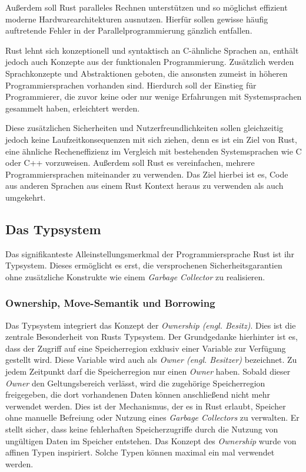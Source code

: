 Außerdem soll Rust paralleles Rechnen unterstützen und
so möglichst effizient moderne Hardwarearchitekturen ausnutzen.
Hierfür sollen gewisse häufig auftretende Fehler in der Parallelprogrammierung gänzlich entfallen.
\cite{theRustLanguage}

Rust lehnt sich konzeptionell und syntaktisch an C-ähnliche Sprachen an, enthält jedoch auch Konzepte aus der
funktionalen Programmierung. Zusätzlich werden Sprachkonzepte und Abstraktionen geboten, die
ansonsten zumeist in höheren Programmiersprachen vorhanden sind. Hierdurch soll der Einstieg für
Programmierer, die zuvor keine oder nur wenige Erfahrungen mit Systemsprachen gesammelt haben, erleichtert werden.
\cite{engineeringServo}

Diese zusätzlichen Sicherheiten und Nutzerfreundlichkeiten sollen gleichzeitig jedoch keine Laufzeitkonsequenzen mit 
sich ziehen, denn es ist ein Ziel von Rust, 
eine ähnliche Recheneffizienz im Vergleich mit bestehenden Systemsprachen wie C oder C++ vorzuweisen.
Außerdem soll Rust es vereinfachen, mehrere Programmiersprachen miteinander zu verwenden.
Das Ziel hierbei ist es, Code aus anderen Sprachen aus einem Rust Kontext heraus zu verwenden als auch umgekehrt.
\cite{rustBook}


\subsection{Das Typsystem}

Das signifikanteste Alleinstellungsmerkmal der Programmiersprache Rust ist ihr Typsystem. Dieses ermöglicht es
erst, die versprochenen Sicherheitsgarantien ohne zusätzliche Konstrukte wie einem \textit{Garbage Collector}
zu realisieren.\cite{rustBook}

\subsubsection{Ownership, Move-Semantik und Borrowing}

Das Typsystem integriert das Konzept der \textit{Ownership (engl. Besitz)}.
Dies ist die zentrale Besonderheit von Rusts Typsystem.
Der Grundgedanke hierhinter ist es, dass der Zugriff auf eine Speicherregion exklusiv einer Variable
zur Verfügung gestellt wird. Diese Variable wird auch als \textit{Owner (engl. Besitzer)} bezeichnet.
Zu jedem Zeitpunkt darf die Speicherregion nur einen \textit{Owner} haben.
Sobald dieser \textit{Owner} den Geltungsbereich verlässt, wird die zugehörige Speicherregion freigegeben,
die dort vorhandenen Daten können anschließend nicht mehr verwendet werden.
Dies ist der Mechanismus, der es in Rust erlaubt, Speicher ohne manuelle Befreiung oder Nutzung eines
\textit{Garbage Collectors} zu verwalten. Er stellt sicher, dass keine fehlerhaften Speicherzugriffe
durch die Nutzung von ungültigen Daten im Speicher entstehen.\cite{rustBook}
Das Konzept des \textit{Ownership} wurde von affinen Typen inspiriert.\cite{embeddedRustOS}
Solche Typen können maximal ein mal verwendet werden.\cite{affineTypes}

